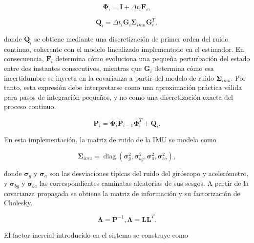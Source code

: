 \begin{equation}
    \boldsymbol{\Phi}_i
    =
    \mathbf{I}
    +
    \Delta t_i
    \mathbf{F}_i,
\end{equation}

\begin{equation}
    \mathbf{Q}_i
    =
    \Delta t_i
    \mathbf{G}_i
    \boldsymbol{\Sigma}_{imu}
    \mathbf{G}_i^{T},
\end{equation}

donde \(\mathbf{Q}_i\) se obtiene mediante una discretización de primer orden del ruido continuo, coherente con el modelo linealizado implementado en el estimador. En consecuencia, \(\mathbf{F}_i\) determina cómo evoluciona una pequeña perturbación del estado entre dos instantes consecutivos, mientras que \(\mathbf{G}_i\) determina cómo esa incertidumbre se inyecta en la covarianza a partir del modelo de ruido \(\boldsymbol{\Sigma}_{imu}\). Por tanto, esta expresión debe interpretarse como una aproximación práctica válida para pasos de integración pequeños, y no como una discretización exacta del proceso continuo.

\begin{equation}
    \mathbf{P}_i
    =
    \boldsymbol{\Phi}_i
    \mathbf{P}_{i-1}
    \boldsymbol{\Phi}_i^{T}
    +
    \mathbf{Q}_i.
\end{equation}

En esta implementación, la matriz de ruido de la IMU se modela como

\begin{equation}
    \boldsymbol{\Sigma}_{imu}
    =
    \operatorname{diag}
    \left(
        \boldsymbol{\sigma}_{g}^{2},
        \boldsymbol{\sigma}_{bg}^{2},
        \boldsymbol{\sigma}_{a}^{2},
        \boldsymbol{\sigma}_{ba}^{2}
    \right),
\end{equation}

donde $\boldsymbol{\sigma}_{g}$ y $\boldsymbol{\sigma}_{a}$ son las desviaciones típicas del ruido del giróscopo y acelerómetro, 
y $\boldsymbol{\sigma}_{bg}$ y $\boldsymbol{\sigma}_{ba}$ las correspondientes caminatas aleatorias de sus sesgos. A partir de la 
covarianza propagada se obtiene la matriz de información y su factorización de Cholesky.

\begin{equation}
    \boldsymbol{\Lambda}
    =
    \mathbf{P}^{-1},
    \boldsymbol{\Lambda}
    =
    \mathbf{L}
    \mathbf{L}^{T}.
\end{equation}


El factor inercial introducido en el sistema se construye como

